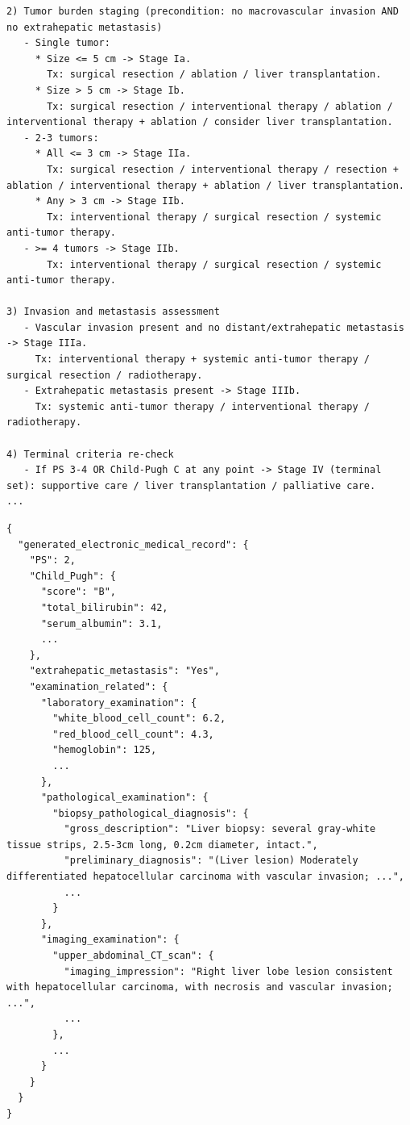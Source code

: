 \documentclass{article}
\begin{document}
\begin{appendices}
\begin{lstlisting}[style=promptmono,floatplacement=h,caption={The summary of decision tree of CNLC},label={lst:hcc_prompt_cnlc}]
2) Tumor burden staging (precondition: no macrovascular invasion AND no extrahepatic metastasis)
   - Single tumor:
     * Size <= 5 cm -> Stage Ia.
       Tx: surgical resection / ablation / liver transplantation.
     * Size > 5 cm -> Stage Ib.
       Tx: surgical resection / interventional therapy / ablation / interventional therapy + ablation / consider liver transplantation.
   - 2-3 tumors:
     * All <= 3 cm -> Stage IIa.
       Tx: surgical resection / interventional therapy / resection + ablation / interventional therapy + ablation / liver transplantation.
     * Any > 3 cm -> Stage IIb.
       Tx: interventional therapy / surgical resection / systemic anti-tumor therapy.
   - >= 4 tumors -> Stage IIb.
       Tx: interventional therapy / surgical resection / systemic anti-tumor therapy.

3) Invasion and metastasis assessment
   - Vascular invasion present and no distant/extrahepatic metastasis -> Stage IIIa.
     Tx: interventional therapy + systemic anti-tumor therapy / surgical resection / radiotherapy.
   - Extrahepatic metastasis present -> Stage IIIb.
     Tx: systemic anti-tumor therapy / interventional therapy / radiotherapy.

4) Terminal criteria re-check
   - If PS 3-4 OR Child-Pugh C at any point -> Stage IV (terminal set): supportive care / liver transplantation / palliative care.
...
\end{lstlisting}

\begin{lstlisting}[style=promptmono,floatplacement=H,caption={An template of synthetic electronic medical record in JSON format},label={lst:json_emrs}]
{
  "generated_electronic_medical_record": {
    "PS": 2,
    "Child_Pugh": {
      "score": "B",
      "total_bilirubin": 42,
      "serum_albumin": 3.1,
      ... 
    },
    "extrahepatic_metastasis": "Yes",
    "examination_related": {
      "laboratory_examination": {
        "white_blood_cell_count": 6.2,
        "red_blood_cell_count": 4.3,
        "hemoglobin": 125,
        ... 
      },
      "pathological_examination": {
        "biopsy_pathological_diagnosis": {
          "gross_description": "Liver biopsy: several gray-white tissue strips, 2.5-3cm long, 0.2cm diameter, intact.",
          "preliminary_diagnosis": "(Liver lesion) Moderately differentiated hepatocellular carcinoma with vascular invasion; ...",
          ... 
        }
      },
      "imaging_examination": {
        "upper_abdominal_CT_scan": {
          "imaging_impression": "Right liver lobe lesion consistent with hepatocellular carcinoma, with necrosis and vascular invasion; ...",
          ... 
        },
        ... 
      }
    }
  }
}
\end{lstlisting} 


\end{appendices}
\end{document}
